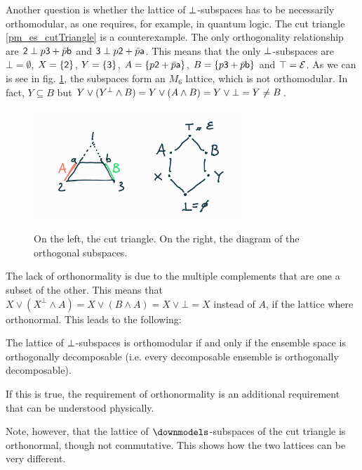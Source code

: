 Another question is whether the lattice of $\ortho$-subspaces has to be necessarily orthomodular, as one requires, for example, in quantum logic. The cut triangle \ref{pm_es_cutTriangle} is a counterexample. The only orthogonality relationship are $\ens[2] \ortho p \ens[3] + \bar{p}\ens[b]$ and $\ens[3] \ortho p \ens[2] + \bar{p}\ens[a]$. This means that the only $\ortho$-subspaces are $\bot = \emptyset$, $X= \{\ens[2]\}$, $Y= \{\ens[3]\}$, $A= \{p \ens[2] + \bar{p}\ens[a]\}$, $B= \{p \ens[3] + \bar{p}\ens[b]\}$ and $\top = \Ens$. As we can is see in fig. \ref{pm_es_figCutTriangleOrthoSubspaces}, the subspaces form an $M_6$ lattice, which is not orthomodular. In fact, $Y \subseteq B$ but $Y \vee (Y^{\ortho} \wedge B) = Y \vee (A \wedge B) = Y \vee \bot = Y \neq B$.

\begin{figure}[h]
	\centering
	\includegraphics[width=0.7\textwidth]{tempimages/CutTriangleSubspaces.jpg}\label{pm_es_figCutTriangleOrthoSubspaces}\caption{On the left, the cut triangle. On the right, the diagram of the orthogonal subspaces.}
\end{figure}

The lack of orthonormality is due to the multiple complements that are one a subset of the other. This means that $X \vee (X^\perp \wedge A) = X \vee (B \wedge A) = X \vee \bot = X$ instead of $A$, if the lattice where orthonormal. This leads to the following:
\begin{conj}
	The lattice of $\ortho$-subspaces is orthomodular if and only if the ensemble space is orthogonally decomposable (i.e. every decomposable ensemble is orthogonally decomposable).
\end{conj}
If this is true, the requirement of orthonormality is an additional requirement that can be understood physically.

Note, however, that the lattice of $\separate$-subspaces  of the cut triangle is orthonormal, though not commutative. This shows how the two lattices can be very different.

